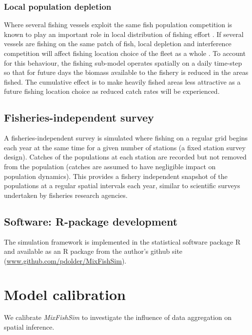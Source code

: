 \documentclass[preprint]{elsarticle}
\begin{document}
\subsubsection{Local population depletion}

Where several fishing vessels exploit the same fish population competition is
known to play an important role in local distribution of fishing effort
\citep{Gillis1998}. If several vessels are fishing on the same patch of fish,
local depletion and interference competition will affect fishing location
choice of the fleet as a whole \citep{Rijnsdorp2000, Poos2007a}. To account
for this behaviour, the fishing sub-model operates spatially on a daily
time-step so that for future days the biomass available to the fishery is
reduced in the areas fished. The cumulative effect is to make heavily fished
areas less attractive as a future fishing location choice as reduced catch
rates will be experienced. 

\subsection{Fisheries-independent survey}

A fisheries-independent survey is simulated where fishing on a regular grid
begins each year at the same time for a given number of stations (a fixed
station survey design). Catches of the populations at each station are recorded
but not removed from the population (catches are assumed to have negligible
impact on population dynamics). This provides a fishery independent snapshot of
the populations at a regular spatial intervals each year, similar to scientific
surveys undertaken by fisheries research agencies. \\

\subsection{Software: R-package development}

The simulation framework is implemented in the statistical software package R
\citep{RCoreTeam2017} and available as an R package from the author's github
site (\url{www.github.com/pdolder/MixFishSim}).\\

\section{Model calibration}
We calibrate \textit{MixFishSim} to investigate the influence of data
aggregation on spatial inference.
\end{document}
